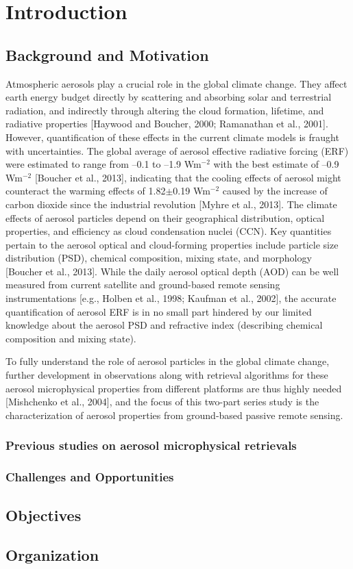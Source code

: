 \chapter{Introduction}

\section{Background and Motivation}

Atmospheric aerosols play a crucial role in the global climate change. They
affect earth energy budget directly by scattering and absorbing solar and
terrestrial radiation, and indirectly through altering the cloud formation,
lifetime, and radiative properties [Haywood and Boucher, 2000; Ramanathan et
al., 2001]. However, quantification of these effects in the current climate
models is fraught with uncertainties. The global average of aerosol effective
radiative forcing (ERF) were estimated to range from --0.1 to --1.9 Wm$^{-2}$ with the 
best estimate of --0.9 Wm$^{-2}$ [Boucher et al., 2013], indicating that the cooling
effects of aerosol might counteract the warming effects of 1.82$\pm$0.19 Wm$^{-2}$
caused by the increase of carbon dioxide since the industrial revolution [Myhre 
et al., 2013]. The climate effects of aerosol particles depend on their
geographical distribution, optical properties, and efficiency as cloud
condensation nuclei (CCN). Key quantities pertain to the aerosol optical and
cloud-forming properties include particle size distribution (PSD), chemical
composition, mixing state, and morphology [Boucher et al., 2013]. While the
daily aerosol optical depth (AOD) can be well measured from current satellite
and ground-based remote sensing instrumentations [e.g., Holben et al., 1998;
Kaufman et al., 2002], the accurate quantification of aerosol ERF is in no
small part hindered by our limited knowledge about the aerosol PSD and
refractive index (describing chemical composition and mixing state). 

To fully understand the role of aerosol particles in the global climate change, 
further development in observations along with retrieval algorithms for these
aerosol microphysical properties from different platforms are thus highly
needed [Mishchenko et al., 2004], and the focus of this two-part series study
is the characterization of aerosol properties from ground-based passive remote
sensing.

\subsection{Previous studies on aerosol microphysical retrievals}

\subsection{Challenges and Opportunities}

\section{Objectives}

\section{Organization}
